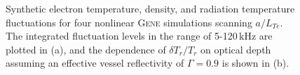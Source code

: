 \documentclass[%
 aip,
 amsmath,amssymb,
 reprint,%
]{revtex4-1}
\newcommand{\gene}[1]{\rmfamily\textsc{Gene}#1}
\begin{document}
\begin{figure}[!htbp]
\centering
\begin{subfigure}[]{.49\textwidth}
  \centering
\end{subfigure}
\hfill
\begin{subfigure}[]{.49\textwidth}
  \centering
\end{subfigure}

\caption{Synthetic electron temperature, density, and radiation temperature fluctuations for four nonlinear \gene{} simulations scanning $a/L_{Te}$. The integrated fluctuation levels in the range of 5-120\,kHz are plotted in (a), and the dependence of $\delta T_r/T_r$  on optical depth assuming an effective vessel reflectivity of $\Gamma = 0.9$ is shown in (b). }
  \label{fig:omte_scan}
\end{figure}
\end{document}
